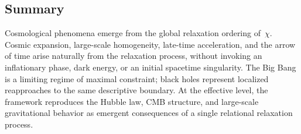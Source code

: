 \subsection{Summary}
\label{subsec:summary-cosmology}

Cosmological phenomena emerge from the global relaxation ordering
of~$\chi$.
Cosmic expansion, large-scale homogeneity, late-time acceleration, and
the arrow of time arise naturally from the relaxation process, without
invoking an inflationary phase, dark energy, or an initial spacetime
singularity.
The Big Bang is a limiting regime of maximal constraint; black holes
represent localized reapproaches to the same descriptive boundary.
At the effective level, the framework reproduces the Hubble law, CMB
structure, and large-scale gravitational behavior as emergent
consequences of a single relational relaxation process.
